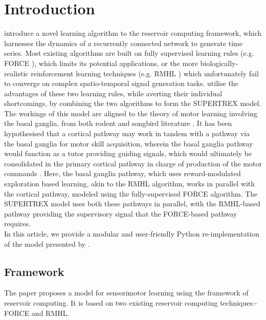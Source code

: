 

\section{Introduction}

\textcite{pyle2019} introduce a novel learning algorithm to the reservoir computing framework, which harnesses the dynamics of a recurrently connected network to generate time series. Most existing algorithms are built on fully supervised learning rules (e.g. FORCE \cite{sussillo2009}), which limits its potential applications, or the more biologically-realistic reinforcement learning techniques (e.g. RMHL \cite{hoerzer2014}) which unfortunately fail to converge on complex spatio-temporal signal generation tasks. \textcite{pyle2019} utilise the advantages of these two learning rules, while averting their individual shortcomings, by combining the two algorithms to form the SUPERTREX model. The workings of this model are aligned to the theory of motor learning involving the basal ganglia, from both rodent and songbird literature \cite{brainard2002}. It has been hypothesised that a cortical pathway may work in tandem with a pathway via the basal ganglia for motor skill acquisition, wherein the basal ganglia pathway would function as a tutor providing guiding signals, which would ultimately be consolidated in the primary cortical pathway in charge of production of the motor commands \cite{olveczky2011}. Here, the basal ganglia pathway, which uses reward-modulated exploration based learning, akin to the RMHL algorithm, works in parallel with the cortical pathway, modeled using the fully-supervised FORCE algorithm. The SUPERTREX model uses both these pathways in parallel, with the RMHL-based pathway providing the supervisory signal that the FORCE-based pathway requires.\\



In this article, we provide a modular and user-friendly Python re-implementation of the model presented by \textcite{pyle2019}.




\subsection{Framework}

The paper \cite{pyle2019} proposes a model for sensorimotor learning using the framework of reservoir computing. It is based on two existing reservoir computing techniques:- FORCE and RMHL.\\

